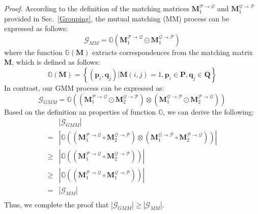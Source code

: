 \emph{Proof.}
According to the definition of the matching matrices $\mathbf{M}^{\mathcal{P}\rightarrow\mathcal{Q} }_1$ and $\mathbf{M}^{\mathcal{Q}\rightarrow\mathcal{P} }_1$ provided in Sec.~\ref{Grouping}, the mutual matching (MM) process can be expressed as follows:
\begin{equation}
    \mathcal{{G}}_{MM} = \mathbb{G}   \left( \mathbf{M}^{\mathcal{P}\rightarrow\mathcal{Q} }_1 \odot \mathbf{M}^{\mathcal{Q}\rightarrow\mathcal{P} }_1  \right) 
\end{equation}
where the function $\mathbb{G}(\mathbf{M})$ extracts correspondences from the matching matrix $\mathbf{M}$, which is defined as follows:
\begin{equation}
     \mathbb{G} \left( \mathbf{M}\right) = \left\{(\mathbf{p}_i, \mathbf{q}_j) | \mathbf{M}(i,j)=1, \mathbf{p}_i\in \mathbf{P}, \mathbf{q}_j\in \mathbf{Q}  \right\}
\end{equation}
In contrast, our GMM process can be expressed as:
\begin{equation}
    \mathcal{{G}}_{GMM} = \mathbb{G}   \left( \left( \mathbf{M}^{\mathcal{P}\rightarrow\mathcal{Q} }_1 \odot \mathbf{M}^{\mathcal{Q}\rightarrow\mathcal{P} }_2  \right) \otimes \left( \mathbf{M}^{\mathcal{Q}\rightarrow\mathcal{P} }_1 \odot \mathbf{M}^{\mathcal{P}\rightarrow\mathcal{Q} }_2  \right) \right) 
\end{equation}
Based on the definition an properties of function $\mathbb{G}$, we can derive the following:
\begin{equation}
    \begin{aligned} 
     & |\mathcal{{G}}_{GMM}|\\
     =&\left|\mathbb{G}   \left( \left( \mathbf{M}^{\mathcal{P}\rightarrow\mathcal{Q} }_1 \circ \mathbf{M}^{\mathcal{Q}\rightarrow\mathcal{P} }_2  \right) \otimes \left( \mathbf{M}^{\mathcal{Q}\rightarrow\mathcal{P} }_1 \circ \mathbf{M}^{\mathcal{P}\rightarrow\mathcal{Q} }_2  \right) \right) \right|\\
     \geqslant & \left|\mathbb{G}   \left( \left( \mathbf{M}^{\mathcal{P}\rightarrow\mathcal{Q} }_1 \circ \mathbf{M}^{\mathcal{Q}\rightarrow\mathcal{P} }_2  \right) \right) \right|\\
     \geqslant & \left|\mathbb{G}   \left( \left( \mathbf{M}^{\mathcal{P}\rightarrow\mathcal{Q} }_1 \circ \mathbf{M}^{\mathcal{Q}\rightarrow\mathcal{P} }_1  \right) \right) \right|\\
     =&|\mathcal{{G}}_{MM}|\\
    \end{aligned} 
 \label{proof4}
\end{equation}
 Thus, we complete the proof that  $|\mathcal{{G}}_{GMM}|\geqslant |\mathcal{{G}}_{MM}|$.


